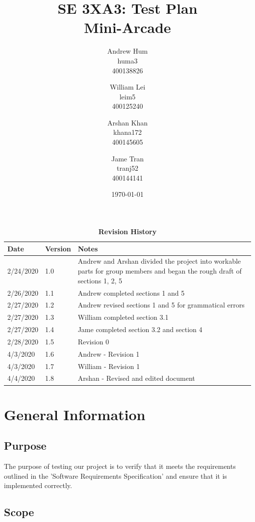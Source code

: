 \documentclass[12pt, titlepage]{article}
\title{SE 3XA3: Test Plan\\Mini-Arcade}
\author{Andrew Hum \\ huma3 \\ 400138826 \and
		William Lei \\ leim5 \\ 400125240 \and
		Arshan Khan \\ khana172 \\ 400145605 \and
		Jame Tran \\ tranj52 \\ 400144141
}
\date{\today}
\begin{document}
\maketitle

\tableofcontents
\listoftables
\listoffigures

\begin{table}[hbp]
\caption{\bf Revision History}
\begin{tabularx}{\textwidth}{p{3cm}p{2cm}X}
\toprule {\bf Date} & {\bf Version} & {\bf Notes}\\
\midrule
2/24/2020 & 1.0 & Andrew and Arshan divided the project into workable parts for group members and began the rough draft of sections 1, 2, 5\\
2/26/2020 & 1.1 & Andrew completed sections 1 and 5\\
2/27/2020 & 1.2 & Andrew revised sections 1 and 5 for grammatical errors\\
2/27/2020 & 1.3 & William completed section 3.1\\
2/27/2020 & 1.4 & Jame completed section 3.2 and section 4\\
2/28/2020 & 1.5 & Revision 0\\
4/3/2020 & 1.6 & Andrew - Revision 1\\
4/3/2020 & 1.7 & William - Revision 1\\
4/4/2020 & 1.8 & Arshan - Revised and edited document\\
\bottomrule
\end{tabularx}
\end{table}

\newpage


\section{General Information}

\subsection{Purpose}

The purpose of testing our project is to verify that it meets the requirements outlined in the 'Software Requirements Specification' and ensure that it is implemented correctly.

\subsection{Scope}
\end{document}

